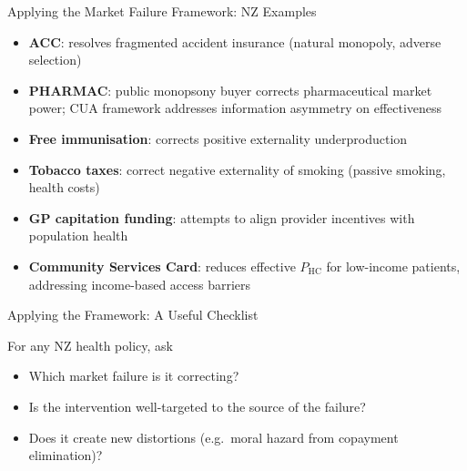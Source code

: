 \documentclass[aspectratio=169, 12pt]{beamer}
\begin{document}
\begin{frame}{Applying the Market Failure Framework: NZ Examples}
  \begin{itemize}
    \item \textbf{ACC}: resolves fragmented accident insurance (natural monopoly, adverse selection)
    \item \textbf{PHARMAC}: public monopsony buyer corrects pharmaceutical market power; CUA
          framework addresses information asymmetry on effectiveness
    \item \textbf{Free immunisation}: corrects positive externality underproduction
    \item \textbf{Tobacco taxes}: correct negative externality of smoking (passive smoking, health costs)
    \item \textbf{GP capitation funding}: attempts to align provider incentives with population health
    \item \textbf{Community Services Card}: reduces effective $P_\text{HC}$ for low-income patients,
          addressing income-based access barriers
  \end{itemize}
\end{frame}

\begin{frame}{Applying the Framework: A Useful Checklist}
  \begin{block}{For any NZ health policy, ask}
    \begin{itemize}
      \item Which market failure is it correcting?
      \item Is the intervention well-targeted to the source of the failure?
      \item Does it create new distortions (e.g.\ moral hazard from copayment elimination)?
    \end{itemize}
  \end{block}
\end{frame}

\end{document}
